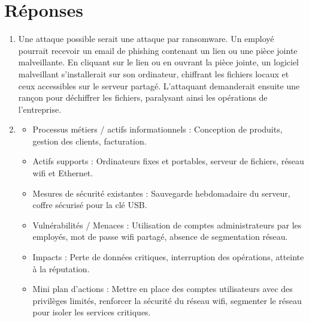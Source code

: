 \documentclass[a4paper,12pt]{article}
\begin{document}
\section{Réponses}
\begin{enumerate}
    \item Une attaque possible serait une attaque par ransomware. Un employé pourrait recevoir un email de phishing contenant un lien ou une pièce jointe malveillante. En cliquant sur le lien ou en ouvrant la pièce jointe, un logiciel malveillant s'installerait sur son ordinateur, chiffrant les fichiers locaux et ceux accessibles sur le serveur partagé. L'attaquant demanderait ensuite une rançon pour déchiffrer les fichiers, paralysant ainsi les opérations de l'entreprise.
    \item 
    \begin{itemize}
        \item Processus métiers / actifs informationnels : Conception de produits, gestion des clients, facturation.
        \item Actifs supports : Ordinateurs fixes et portables, serveur de fichiers, réseau wifi et Ethernet.
        \item Mesures de sécurité existantes : Sauvegarde hebdomadaire du serveur, coffre sécurisé pour la clé USB.
        \item Vulnérabilités / Menaces : Utilisation de comptes administrateurs par les employés, mot de passe wifi partagé, absence de segmentation réseau.
        \item Impacts : Perte de données critiques, interruption des opérations, atteinte à la réputation.
        \item Mini plan d’actions : Mettre en place des comptes utilisateurs avec des privilèges limités, renforcer la sécurité du réseau wifi, segmenter le réseau pour isoler les services critiques.
    \end{itemize}
\end{enumerate}
\end{document}
